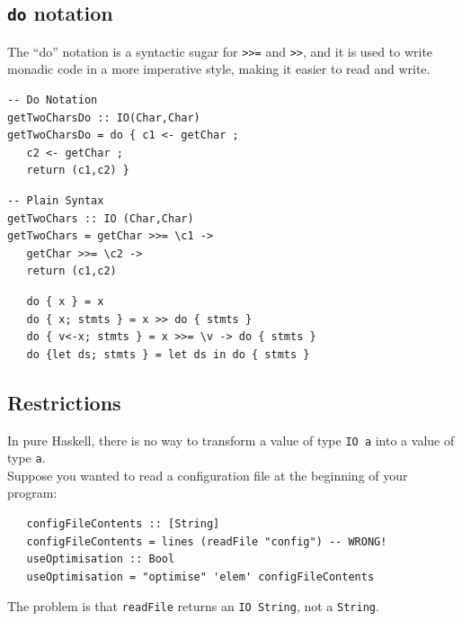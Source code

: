 \subsection{\texttt{do} notation}
The ``do'' notation is a syntactic sugar for \lstinline|>>=| and \lstinline|>>|, and it is used to write monadic code in a more imperative style, making it easier to read and write.

\begin{paracol}{2}
\begin{lstlisting}
-- Do Notation
getTwoCharsDo :: IO(Char,Char)
getTwoCharsDo = do { c1 <- getChar ;
   c2 <- getChar ;
   return (c1,c2) }
\end{lstlisting}
\switchcolumn
\begin{lstlisting}
-- Plain Syntax
getTwoChars :: IO (Char,Char)
getTwoChars = getChar >>= \c1 ->
   getChar >>= \c2 ->
   return (c1,c2)
\end{lstlisting}

\end{paracol}

\begin{lstlisting}
   do { x } = x
   do { x; stmts } = x >> do { stmts }
   do { v<-x; stmts } = x >>= \v -> do { stmts }
   do {let ds; stmts } = let ds in do { stmts }
\end{lstlisting}

\subsection{Restrictions}
In pure Haskell, there is no way to transform a value of type
\lstinline|IO a| into a value of type \lstinline|a|.\\
Suppose you wanted to read a configuration file at the
beginning of your program:
\begin{lstlisting}
   configFileContents :: [String]
   configFileContents = lines (readFile "config") -- WRONG!
   useOptimisation :: Bool
   useOptimisation = "optimise" 'elem' configFileContents
\end{lstlisting}
The problem is that \lstinline|readFile| returns an \lstinline|IO String|, not a
\lstinline|String|.

